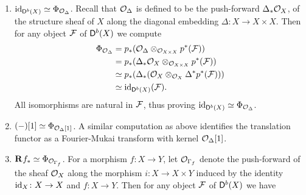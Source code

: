 \begin{example}
    \label{Identifying fm transforms}
\begin{enumerate}[label = (\roman*)]
    \item{
    $\operatorname{id}_{\mathsf{D}^b(X)} \simeq \Phi_{{\mathcal{O}_{\Delta}}}$. Recall that ${\mathcal{O}_{\Delta}}$ is defined to be the push-forward $\Delta_*{\mathcal{O}_{X}}$, of the structure sheaf of $X$ along the diagonal embedding $\Delta \colon X \to X \times X$. Then for any object $\mathcal F$ of $\mathsf{D}^b(X)$ we compute 
    \begin{align*}
        \Phi_{{\mathcal{O}_{\Delta}}} &= p_*({\mathcal{O}_{\Delta}} \otimes_{{\mathcal{O}_{X \times X}}} p^*(\mathcal F)) \\
        &= p_*(\Delta_*{\mathcal{O}_{X}} \otimes_{{\mathcal{O}_{X \times X}}} p^*(\mathcal F)) \\
        &\simeq p_*(\Delta_*({\mathcal{O}_{X}} \otimes_{{\mathcal{O}_{X}}} \Delta^*p^*(\mathcal F))) \\
        &\simeq \operatorname{id}_{\mathsf{D}^b(X)}(\mathcal F).
    \end{align*}
    All isomorphisms are natural in $\mathcal F$, thus proving $\operatorname{id}_{\mathsf{D}^b(X)} \simeq \Phi_{{\mathcal{O}_{\Delta}}}$.
    }
    \item{$(-)[1] \simeq \Phi_{{\mathcal{O}_{\Delta}}[1]}$. A similar computation as above identifies the translation functor as a Fourier-Mukai transform with kernel ${\mathcal{O}_{\Delta}}[1]$.}
    \item{$\mathbf{R}^{}f_* \simeq \Phi_{{\mathcal{O}_{\Gamma_f}}}$. For a morphism $f \colon X \to Y$, let ${\mathcal{O}_{\Gamma_f}}$ denote the push-forward of the sheaf ${\mathcal{O}_{X}}$ along the morphism $i\colon X \to X \times Y$ induced by the identity $\operatorname{id}_{X}\colon X \to X$ and $f\colon X \to Y$.  Then for any object $\mathcal F$ of $\mathsf{D}^b(X)$ we have
    \begin{align*}

\end{align*}}
\end{enumerate}
\end{example}
